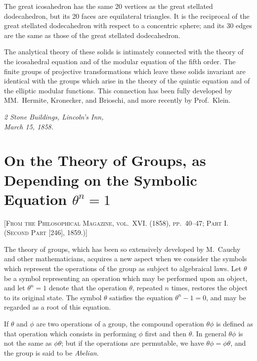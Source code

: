 \documentclass[11pt,a4paper]{book}
\begin{document}
\setcounter{page}{88}

The great icosahedron has the same 20 vertices as the great stellated dodecahedron, but its 20 faces are equilateral triangles. It is the reciprocal of the great stellated dodecahedron with respect to a concentric sphere; and its 30 edges are the same as those of the great stellated dodecahedron.

The analytical theory of these solids is intimately connected with the theory of the icosahedral equation and of the modular equation of the fifth order. The finite groups of projective transformations which leave these solids invariant are identical with the groups which arise in the theory of the quintic equation and of the elliptic modular functions. This connection has been fully developed by MM.~Hermite, Kronecker, and Brioschi, and more recently by Prof.~Klein.

\medskip
\noindent\textit{2 Stone Buildings, Lincoln's Inn,\\March 15, 1858.}

\newpage


\section{On the Theory of Groups, as Depending on the Symbolic Equation $\theta^n = 1$}

\textsc{[From the Philosophical Magazine, vol.~XVI. (1858), pp.~40--47; Part I. (Second Part [246], 1859.)]}
\label{paper:243}

\setcounter{page}{89}

The theory of groups, which has been so extensively developed by M.~Cauchy and other mathematicians, acquires a new aspect when we consider the symbols which represent the operations of the group as subject to algebraical laws. Let $\theta$ be a symbol representing an operation which may be performed upon an object, and let $\theta^n = 1$ denote that the operation $\theta$, repeated $n$ times, restores the object to its original state. The symbol $\theta$ satisfies the equation $\theta^n - 1 = 0$, and may be regarded as a root of this equation.

If $\theta$ and $\phi$ are two operations of a group, the compound operation $\theta\phi$ is defined as that operation which consists in performing $\phi$ first and then $\theta$. In general $\theta\phi$ is not the same as $\phi\theta$; but if the operations are permutable, we have $\theta\phi = \phi\theta$, and the group is said to be \textit{Abelian}.
\end{document}
